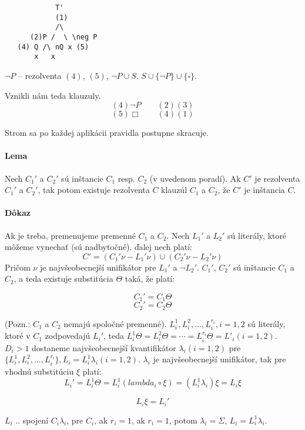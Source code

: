 \begin{verbatim}
            T'
            (1)
            /\
      (2)P /  \ \neg P
   (4) Q /\ nQ x (5)
       x   x
\end{verbatim}

\par $\neg P$ -- rezolventa $(4)$, $(5)$, $\neg P \cup S$.  $S\cup \{ \neg P
\}\cup \{ \square \}$.

\par Vznikli nám teda klauzuly.
$$(4) \neg P\qquad (2) (3)$$
$$(5) \Box\qquad (4)(1)$$

\par Strom sa po každej aplikácii pravidla postupne skracuje. 

\paragraph{Lema} Nech $C_1'$ a $C_2'$ sú inštancie $C_1$ resp. $C_2$ (v uvedenom
poradí). Ak $C'$ je rezolventa $C_1'$ a $C_2'$, tak potom existuje rezolventa
$C$ klauzúl $C_1$ a $C_2$, že $C'$ je inštancia $C$. 

\paragraph{Dôkaz} Ak je treba, premenujeme premenné $C_1$ a $C_2$. Nech $L_1'$ a
$L_2'$ sú literály, ktoré môžeme vynechať (sú nadbytočné). ďalej nech platí:
$$C' = (C_1' \nu - L_1'\nu) \cup ( C_2'\nu - L_2'\nu)$$
Pričom $\nu$ je najvšeobecnejší unifikátor pre $L_1'$ a $\neg L_2'$. $C_1'$,
$C_2'$ sú inštancie $C_1$ a $C_2$, a teda existuje substitúcia $\Theta$ taká, že
platí:

$$ C_1' = C_1 \Theta $$
$$ C_2' = C_2 \Theta $$

(Pozn.: $C_1$ a $C_2$ nemajú spoločné premenné). $L^1_i, L^2_i, \ldots, L^{r_i}_i,
i=1,2$ sú literály, ktoré v $C_1$ zodpovedajú $L_i'$, teda $L^1_i \Theta = L^2_i
\Theta = \cdots = L^{r_i}_i\Theta = L'_i (i=1,2)$. $D_i > 1$ dostaneme
najvšeobecnejší kvantifikátor $\lambda_i (i=1,2)$ pre $\{ L^1_i, L^2_i, \ldots,
L^{r_i}_i\}, L_i = L^1_i \lambda_i (i=1,2)$. $\lambda_i$ je najvšeobecnejší
unifikátor, tak pre vhodnú substitúciu $\xi$ platí:
$$ L_i' = L^1_i \Theta = L^1_i (lambda_i \circ \xi) = (L^1_i\lambda_i)\xi =
L_i \xi$$

$$L_i\xi = L_i'$$

$L_i$ .. spojení $C_i\lambda_i$, pre $C_i$, ak $r_i = 1$, ak $r_i = 1$, potom
$\lambda_i = \Sigma$, $L_i = L_i^1\lambda_i$.

